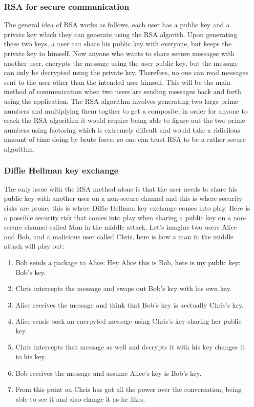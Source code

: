 \documentclass[twoside]{article}
\begin{document}
\begin{multicols}{2}
\subsubsection{RSA for secure communication}
The general idea of RSA works as follows, each user has a public key and a private key which they can generate using the RSA algorith. Upon generating these two keys, a user can share his public key with 
everyone, but keeps 
the private key to himself. Now anyone who wants to share secure messages with another user, encrypts the message using the user public key, but the message can only be decrypted using the private key. Therefore, no 
one can read messages sent to the user other than the intended user himself. This will be the main method of communication when two users are sending messages back and forth using the application. The RSA algorithm involves generating two large prime numbers and multiplying them togther to get a composite, in order for anyone to 
crack the RSA algorithm it would require being able to figure out the two prime numbers using factoring which is extremely diffcult and would take a ridicilous amount of time doing by brute force, so one can 
trust RSA to be a rather secure algorithm.
\subsubsection{Diffie Hellman key exchange}
The only issue with the RSA method alone is that the user needs to share his public key with another user on a non-secure channel and this 
is where security risks are prone, this is where Diffie Hellman key exchange comes into play. Here is a possible security risk that comes into play when sharing a public key on a non-secure channel called Man in the middle attack. Let's imagine two users Alice and Bob, and a malicious user called Chris, here is how a man in the middle attack will play out:

\begin{enumerate}
  \item Bob sends a package to Alice: Hey Alice this is Bob, here is my public key: Bob's key.
  \item Chris intercepts the message and swaps out Bob's key with his own key.
  \item Alice receives the message and think that Bob's key is acctually Chris's key.
  \item Alice sends back an encrpyted message using Chris's key sharing her public key. 
  \item Chris intercepts that message as well and decrypts it with his key changes it to his key.
  \item Bob receives the message and assume Alice's key is Bob's key.
  \item From this point on Chris has got all the power over the conversation, being able to see it and also change it as he likes. 
\end{enumerate}


\end{multicols}
\end{document}
